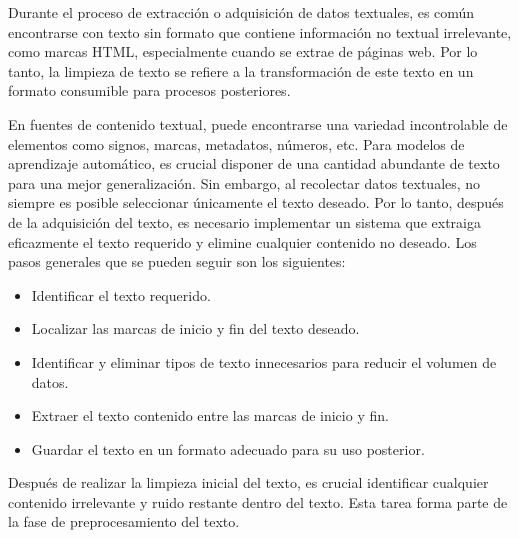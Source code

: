 Durante el proceso de extracción o adquisición de datos textuales, es común encontrarse con texto sin formato que contiene información no textual irrelevante, como marcas HTML, especialmente cuando se extrae de páginas web. Por lo tanto, la limpieza de texto se refiere a la transformación de este texto en un formato consumible para procesos posteriores.

En fuentes de contenido textual, puede encontrarse una variedad incontrolable de elementos como signos, marcas, metadatos, números, etc. Para modelos de aprendizaje automático, es crucial disponer de una cantidad abundante de texto para una mejor generalización. Sin embargo, al recolectar datos textuales, no siempre es posible seleccionar únicamente el texto deseado. Por lo tanto, después de la adquisición del texto, es necesario implementar un sistema que extraiga eficazmente el texto requerido y elimine cualquier contenido no deseado. Los pasos generales que se pueden seguir son los siguientes:

\begin{itemize}

\item Identificar el texto requerido.
\item Localizar las marcas de inicio y fin del texto deseado.
\item Identificar y eliminar tipos de texto innecesarios para reducir el volumen de datos.
\item Extraer el texto contenido entre las marcas de inicio y fin.
\item Guardar el texto en un formato adecuado para su uso posterior.

\end{itemize}

Después de realizar la limpieza inicial del texto, es crucial identificar cualquier contenido irrelevante y ruido restante dentro del texto. Esta tarea forma parte de la fase de preprocesamiento del texto.